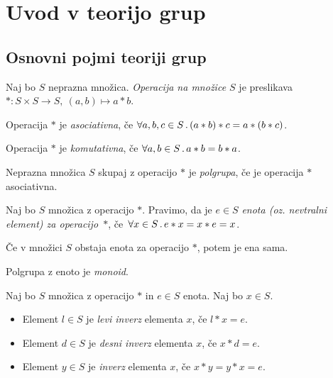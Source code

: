 \section{Uvod v teorijo grup}
\subsection{Osnovni pojmi teoriji grup}
\begin{definicija}
    Naj bo $S$ neprazna množica. \emph{Operacija na množice $S$} je preslikava $*: S \times S \to S, \ (a,b) \mapsto a * b$.

    Operacija $*$ je \emph{asociativna}, če $\forall a, b, c \in S \,.\, (a*b)*c = a*(b*c)$.

    Operacija $*$ je \emph{komutativna}, če $\forall a, b \in S \,.\, a* b = b* a$.
\end{definicija}

\begin{definicija}
    Neprazna množica $S$ skupaj z operacijo $*$ je \emph{polgrupa}, če je operacija $*$ asociativna.
\end{definicija}

\begin{definicija}
    Naj bo $S$ množica z operacijo $*$. Pravimo, da je $e \in S$ \emph{enota (oz. nevtralni element) za operacijo~$*$}, če~$\forall x \in S \,.\, e * x = x * e = x$.
\end{definicija}

\begin{trditev}
    Če v množici $S$ obstaja enota za operacijo $*$, potem je ena sama.
\end{trditev}

\begin{definicija}
    Polgrupa z enoto je \emph{monoid}.
\end{definicija}

\begin{definicija}
    Naj bo $S$ množica z operacijo $*$ in $e \in S$ enota. Naj bo $x \in S$.
    \begin{itemize}
        \item Element $l \in S$ je \emph{levi inverz} elementa $x$, če $l * x = e$.
        \item Element $d \in S$ je \emph{desni inverz} elementa $x$, če $x * d = e$.
        \item Element $y \in S$ je \emph{inverz} elementa $x$, če $x *y = y* x = e$.
    \end{itemize}
\end{definicija}

